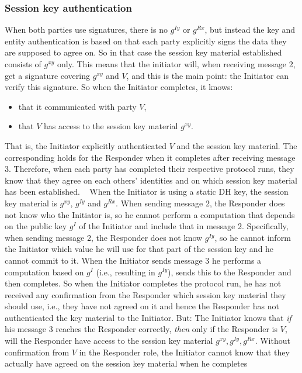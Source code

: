 \documentclass[a4paper,11pt]{article}
\theoremstyle{plain}
\theoremstyle{plain}
\begin{document}
\subsubsection{Session key authentication}
%
When both parties use signatures, there is no $g^{Iy}$ or $g^{Rx}$, but instead
the key and entity authentication is based on that each party explicitly signs
the data they are supposed to agree on.
%
So in that case the session key material established consists of $g^{xy}$
only.
% 
This means that the initiator will, when receiving message 2, get a signature
covering $g^{xy}$ and $V$, and this is the main point: the Initiator can
verify this signature.
%
So when the Initiator completes, it knows:
%
\begin{itemize}
    \item that it communicated with party $V$,
    \item that $V$ has access to the session key material $g^{xy}$.
\end{itemize}
%
That is, the Initiator explicitly authenticated $V$ and the session key
material.
%
The corresponding holds for the Responder when it completes after receiving
message 3.
%
Therefore, when each party has completed their respective protocol
runs, they know that they agree on each others' identities and on which session
key material has been established.
%
 
When the Initiator is using a static DH key, the session key material is
$g^{xy}$, $g^{Iy}$ and $g^{Rx}$.
%
When sending message 2, the Responder does not know who the Initiator is, so
he cannot perform a computation that depends on the public key $g^{I}$ of the
Initiator and include that in message 2.
%
Specifically, when sending message 2, the Responder does not know $g^{Iy}$, so
he cannot inform the Initiator which value he will use for that part of the
session key and he cannot commit to it.
%
When the Initiator sends message 3 he performs a computation based on $g^I$
(i.e., resulting in $g^{Iy}$), sends this to the Responder and then completes.
%
So when the Initiator completes the protocol run, he has not received any
confirmation from the Responder which session key material they should use,
i.e., they have not agreed on it and hence the Responder has not authenticated
the key material to the Initiator.
%
But: The Initiator knows that \emph{if} his message 3 reaches the Responder
correctly, \emph{then} only if the Responder is $V$, will the Responder have
access to the session key material $g^{xy}, g^{Iy}, g^{Rx}$.
%
Without confirmation from $V$ in the Responder role, the Initiator cannot know
that they actually have agreed on the session key material when he completes
\end{document}
